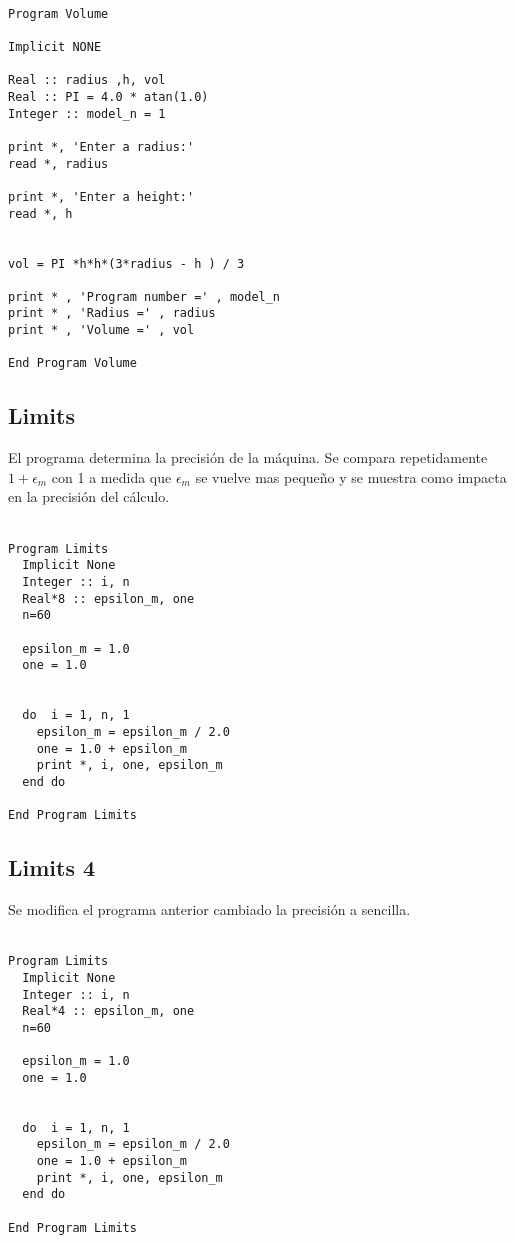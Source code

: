 \documentclass{article}
\begin{document}
\begin{Verbatim}[frame=single]

Program Volume

Implicit NONE

Real :: radius ,h, vol
Real :: PI = 4.0 * atan(1.0) 
Integer :: model_n = 1 

print *, 'Enter a radius:'
read *, radius 

print *, 'Enter a height:'
read *, h


vol = PI *h*h*(3*radius - h ) / 3

print * , 'Program number =' , model_n
print * , 'Radius =' , radius
print * , 'Volume =' , vol

End Program Volume

\end{Verbatim}


\subsection*{Limits}
El programa determina la precisi\'on de la m\'aquina. Se compara repetidamente $1 + \epsilon_m$ con 1 a medida que $\epsilon_m$ se vuelve mas peque\~no y se muestra como impacta en la precisi\'on del c\'alculo.\\ \\
	
\begin{Verbatim}[frame=single]
Program Limits
  Implicit None
  Integer :: i, n
  Real*8 :: epsilon_m, one
  n=60         

  epsilon_m = 1.0
  one = 1.0


  do  i = 1, n, 1                 
    epsilon_m = epsilon_m / 2.0  
    one = 1.0 + epsilon_m         
    print *, i, one, epsilon_m    
  end do                          

End Program Limits
\end{Verbatim}


\subsection*{Limits 4}
Se modifica el programa anterior cambiado la precisi\'on a sencilla.\\ \\
	
		
\begin{Verbatim}[frame=single]
Program Limits
  Implicit None
  Integer :: i, n
  Real*4 :: epsilon_m, one
  n=60         

  epsilon_m = 1.0
  one = 1.0


  do  i = 1, n, 1                 
    epsilon_m = epsilon_m / 2.0  
    one = 1.0 + epsilon_m         
    print *, i, one, epsilon_m    
  end do                          

End Program Limits


\end{Verbatim}
\end{document}
